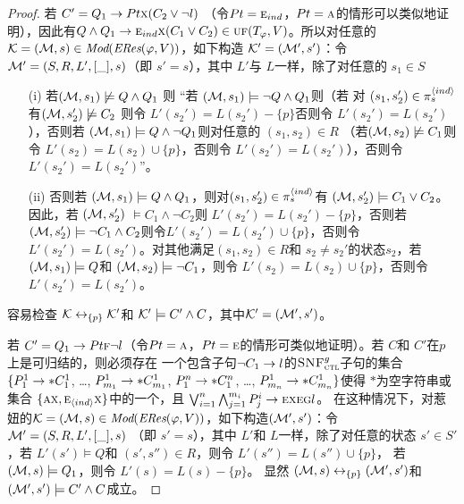 \begin{proof}
	若 $C'= Q_1\rightarrow Pt \textsc{x} (C_2 \vee \neg l)$ （令$Pt=\textsc{e}_{ind}$，$Pt = \textsc{a}$的情形可以类似地证明），因此有$Q \wedge Q_1 \rightarrow \textsc{e}_{ind} \textsc{x}(C_1 \vee C_2) \in \textsc{uf}(T_\varphi,V)$。所以对任意的 ${\cal K}=({\cal M}, s)\in \textit{Mod}(\emph{ERes}(\varphi,V))$，如下构造 ${\cal K}'=({\cal M}',s')$：令${\cal M}'= (S, R, L', [\_], s)$（即 $s'=s$），其中 $L'$与 $L$一样，除了对任意的 $s_1\in S$
	\begin{itemize}
		\item[(i)] 若$({\cal M}, s_1) \not \models Q \wedge Q_1$ 则 “若 $({\cal M}, s_1) \models \neg Q \wedge Q_1$则（若 对 $(s_1, s_2') \in \pi_s^{{\langle{ind}\rangle}}$有$({\cal M}, s_2') \not \models C_2$  则令 $L'(s_2') = L(s_2') - \{p\}$否则令 $L'(s_2') = L(s_2')$），否则若 $({\cal M}, s_1) \models Q \wedge \neg Q_1$则对任意的 $(s_1, s_2) \in R$ （若$({\cal M}, s_2) \not \models C_1$则令 $L'(s_2) = L(s_2) \cup \{p\}$，否则令 $L'(s_2') = L(s_2')$），否则令 $L'(s_2') = L(s_2')$”。
		\item[(ii)] 否则若 $({\cal M}, s_1) \models Q \wedge Q_1$，则对$(s_1, s_2') \in \pi_s^{{\langle{ind}\rangle}}$有 $({\cal M},s_2') \models C_1 \vee C_2$。因此，若 $({\cal M}, s_2')$ $\models C_1 \wedge \neg C_2$则 $L'(s_2') = L(s_2') - \{p\}$，否则若 $({\cal M}, s_2') \models \neg C_1 \wedge C_2$则令$L'(s_2') = L(s_2') \cup \{p\}$，否则令 $L'(s_2') = L(s_2')$。对其他满足$(s_1, s_2) \in R$和 $s_2 \not = s_2'$的状态$s_2$，若 $({\cal M}, s_1) \models Q$和 $({\cal M}, s_2) \models \neg C_1$，则令 $L'(s_2) = L(s_2) \cup \{p\}$，否则令 $L'(s_2') = L(s_2')$。
	\end{itemize}
	容易检查 ${\cal K} \leftrightarrow_{\{p\}} {\cal K}'$和 ${\cal K}' \models C' \wedge C$，其中${\cal K}' = ({\cal M}',s')$。
	
	若 $C' =  Q_1\rightarrow Pt \textsc{f} \neg l$（令$Pt=\textsc{a}$，$Pt = \textsc{e}$的情形可类似地证明）。若 $C$和 $C'$在$p$上是可归结的，则必须存在 一个包含子句$\neg C_1 \rightarrow l$的${\textsc{SNF}_{\textsc{ctl}}^g}$子句的集合 $\{P_1^1 \rightarrow * C_1^1$, \dots, $P_{m_1}^1 \rightarrow * C_{m_1}^1$, $P_1^n \rightarrow * C_1^n$, \dots, $P_{m_n}^1 \rightarrow * C_{m_n}^1 \}$使得 $*$为空字符串或集合 $\{\textsc{a} \textsc{x}, \textsc{e}_{{\langle{ind}\rangle}} \textsc{x}\}$中的一个，且 $\bigvee_{i=1}^n \bigwedge_{j=1}^{m_i} P_j^i \rightarrow \textsc{e} \textsc{x} \textsc{e} \textsc{g} l$。
	在这种情况下，对惹妞的${\cal K}=({\cal M}, s)\in \textit{Mod}(\emph{ERes}(\varphi,V))$，如下构造$({\cal M}',s')$：令${\cal M}'= (S, R, L', [\_],s)$ （即 $s'=s$），其中  $L'$和 $L$一样，除了对任意的状态 $s'\in S'$，若 $L'(s') \models Q$和 $(s',s'') \in R$，则令 $L'(s'') = L(s'') \cup \{p\}$， 若 $({\cal M},s)\models Q_1$，则令 $L'(s) = L(s) - \{p\}$。
	显然 $({\cal M}, s) \leftrightarrow_{\{p\}} ({\cal M}', s')$和 $({\cal M}',s') \models C' \wedge C$成立。	
	

\end{proof}

